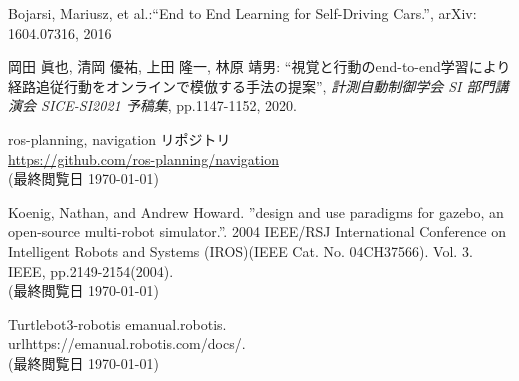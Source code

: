 \documentclass[10pt]{ujarticle}
\begin{document}
    \vspace{5truemm}
    {\footnotesize
        \begin{thebibliography}{99}

            Bojarsi, Mariusz, et al.:``End to End Learning for Self-Driving Cars.'', arXiv: 1604.07316, 2016
            
            岡田 眞也, 清岡 優祐, 上田 隆一, 林原 靖男: ``視覚と行動のend-to-end学習により経路追従行動をオンラインで模倣する手法の提案'', \textit{計測自動制御学会 SI 部門講演会 SICE-SI2021 予稿集}, pp.1147-1152, 2020.



            ros-planning, navigation リポジトリ\\
            \url{https://github.com/ros-planning/navigation}\\
            (最終閲覧日 \today)


            Koenig, Nathan, and Andrew Howard. ”design and use paradigms for gazebo, an open-source multi-robot simulator.”. 2004 IEEE/RSJ International Conference on Intelligent Robots and Systems (IROS)(IEEE Cat. No. 04CH37566). Vol. 3. IEEE, pp.2149-2154(2004).\\
            (最終閲覧日 \today)

            Turtlebot3-robotis emanual.robotis.\\
            url{https://emanual.robotis.com/docs/.}\\
            (最終閲覧日 \today)
            
        \end{thebibliography}
    }
\end{document}
